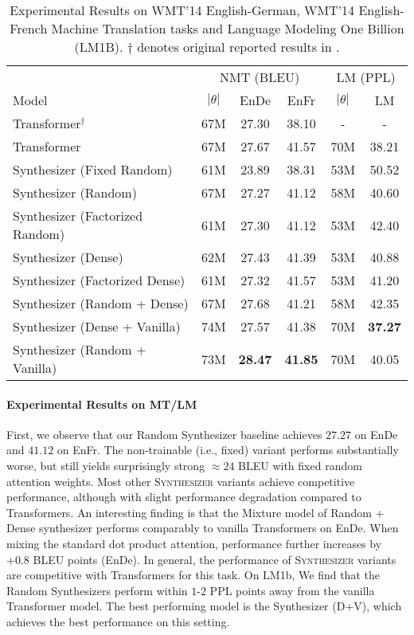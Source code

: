 \documentclass{article}
\begin{document}
\begin{table*}[t]
\centering
\small
    \begin{tabular}{l|ccc|cc}
    \toprule
     &    \multicolumn{3}{c}{NMT (BLEU) } & \multicolumn{2}{c}{LM (PPL)}\\
         Model & $|\theta|$ & EnDe & EnFr & $|\theta|$ & LM \\
         \midrule
         Transformer$^\dagger$
          & 67M &  27.30 & 38.10 & - &- \\
         Transformer & 67M & 27.67  & 41.57 & 70M & 
         38.21\\
\midrule
Synthesizer (Fixed Random)  & 61M & 23.89  & 38.31 & 53M &50.52 \\
         Synthesizer (Random) & 67M & 27.27 & 41.12 & 58M & 40.60 \\
         Synthesizer (Factorized Random) & 61M & 27.30 & 41.12 &53M & 42.40 \\
Synthesizer (Dense)  & 62M & 27.43  & 41.39 & 53M & 40.88 \\
      Synthesizer (Factorized Dense) & 61M & 27.32 & 41.57  & 53M & 41.20  \\
Synthesizer (Random + Dense) & 67M & 27.68 &  41.21 & 58M &42.35 \\ 
        Synthesizer (Dense + Vanilla) & 74M &27.57  & 41.38 & 70M & \textbf{37.27} \\
Synthesizer (Random + Vanilla) & 73M & \textbf{28.47} &  \textbf{41.85} & 70M & 40.05\\
         \bottomrule
    \end{tabular}
    \caption{Experimental Results on WMT'14 English-German, WMT'14 English-French Machine Translation tasks and Language Modeling One Billion (LM1B). $\dagger$ denotes original reported results in \citep{vaswani2017attention}.}
     \label{tab:ende}
     \end{table*}

\paragraph{Experimental Results on MT/LM} First, we observe that our Random Synthesizer baseline achieves $27.27$ on EnDe and $41.12$ on EnFr.  The non-trainable (i.e., fixed) variant performs substantially worse, but still yields surprisingly strong $\approx 24$ BLEU with fixed random attention weights. Most other \textsc{Synthesizer} variants achieve competitive performance, although with slight performance degradation compared to Transformers. An interesting finding is that the Mixture model of Random + Dense synthesizer performs comparably to vanilla Transformers on EnDe. When mixing the standard dot product attention, performance further increases by $+0.8$ BLEU points (EnDe). In general, the performance of \textsc{Synthesizer} variants are competitive with Transformers for this task. On LM1b, We find that the Random Synthesizers perform within $1$-$2$ PPL points away from the vanilla Transformer model. The best performing model is the Synthesizer (D+V), which achieves the best performance on this setting.
\end{document}
